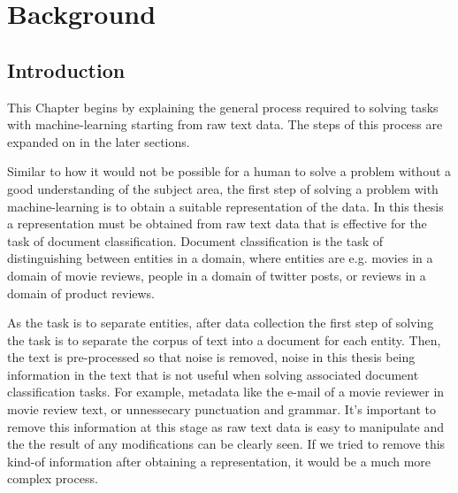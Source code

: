 \chapter{Background}




\section{Introduction}

This Chapter begins by explaining the general process required to solving tasks with machine-learning starting from raw text data. The steps of this process are expanded on in the later sections.


Similar to how it would not be possible for a human to solve a problem without a good understanding of the subject area, the first step of solving a problem with  machine-learning  is to obtain a suitable  representation of the data. In this thesis a representation must be obtained from raw text data that is effective for the task of document classification. Document classification is the task of distinguishing between entities in a domain, where entities are e.g. movies in a domain of movie reviews, people in a domain of twitter posts, or reviews in a domain of product reviews. 

As the task is to separate entities, after data collection the first step of solving the task is to separate the corpus of text into a document for each entity. Then, the text is pre-processed so that noise is removed, noise in this thesis being information in the text that is not useful when solving associated document classification tasks. For example, metadata like the e-mail of a movie reviewer in movie review text, or unnessecary punctuation and grammar. It's important to remove this information at this stage as raw text data is easy to manipulate and the the result of any modifications can be clearly seen. If we tried to remove this kind-of information after obtaining a representation, it would be a much more complex process.


